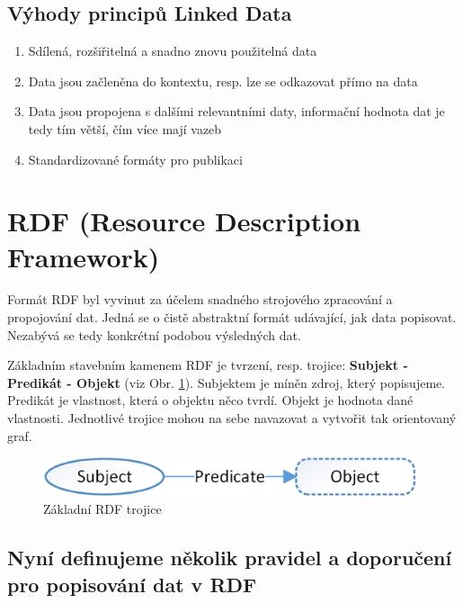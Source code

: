 \subsection*{Výhody principů Linked Data\cite{5starInfo, linkedData}}

\begin{enumerate}
\item Sdílená, rozšiřitelná a snadno znovu použitelná data   
\item Data jsou začleněna do kontextu, resp. lze se odkazovat přímo na data
\item Data jsou propojena s dalšími relevantními daty, informační hodnota dat je tedy tím větší, čím více mají vazeb
\item Standardizované formáty pro publikaci
\end{enumerate}

\newpage

\section{RDF (Resource Description Framework)}
\label{sec:RDF}

Formát RDF byl vyvinut za účelem snadného strojového zpracování a propojování dat. Jedná se o čistě abstraktní formát udávající, jak data popisovat. Nezabývá se tedy konkrétní podobou výsledných dat. 

Základním stavebním kamenem RDF je tvrzení, resp. trojice: \textbf{Subjekt - Predikát - Objekt} (viz Obr. \ref{obr:rdf_basic}). Subjektem je míněn zdroj, který popisujeme. Predikát je vlastnost, která o objektu něco tvrdí. Objekt je hodnota dané vlastnosti. Jednotlivé trojice mohou na sebe navazovat a vytvořit tak orientovaný graf.

\begin{figure}[h]
\centerline{\includegraphics[width=110mm]{img/rdf_basic.eps}}
\caption{Základní RDF trojice}
\label{obr:rdf_basic}
\end{figure}

\subsection*{Nyní definujeme několik pravidel a doporučení pro popisování dat v RDF}

